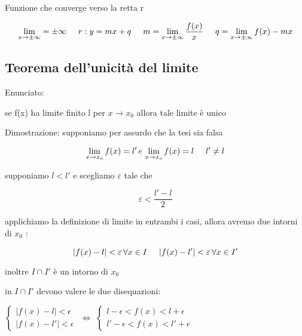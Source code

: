 \documentclass[a4paper,11pt]{article}
\begin{document}
Funzione che converge verso la retta r

\begin{center}
    \[  
        \lim_{x \to  \pm \infty} = \pm \infty
        \hspace{5mm}
        r: y = mx + q 
        \hspace{5mm}
        m = \lim_{x \to  \pm \infty} \frac{f(x)}{x}
        \hspace{5mm}
        q = \lim_{x \to  \pm \infty} f(x) - mx
    \]

\end{center}

\subsection{Teorema dell'unicità del limite}

Enunciato: 

se f(x) ha limite finito l per \(x \to x_0\) allora tale limite è unico

Dimostrazione: 
supponiamo per assurdo che la tesi sia falsa
\begin{center}
    \[
    \lim_{x \to x_o} f(x) = l' \, e \, \lim_{x \to x_o} f(x) = l \hspace{5mm} l' \neq l
    \]
\end{center}

supponiamo \( l<l' \) e scegliamo \(\varepsilon\) tale che 

\begin{center}
    \[
    \varepsilon < \frac{l' - l}{2}
    \]
\end{center}

applichiamo la definizione di limite in entrambi i casi, allora avremo due intorni di \(  x_0 \) : 
\begin{center}
    \[
    \vert f(x) - l \vert < \varepsilon \, \forall x \in I \hspace{5mm}   \vert f(x) - l' \vert < \varepsilon \, \forall x \in I'
    \] 
\end{center}

inoltre \(  I \cap I' \) è un intorno di \(  x_0 \)

in \(  I \cap I' \) devono valere le due disequazioni:

$\begin{cases}
    \vert f(x) - l \vert < \epsilon \\
    \vert f(x) - l' \vert < \epsilon
    \end{cases}$
    $\Longleftrightarrow$
    $\begin{cases}
    l - \epsilon < f(x) < l + \epsilon \\
    l' - \epsilon < f(x) < l' + \epsilon
\end{cases}$
\end{document}
